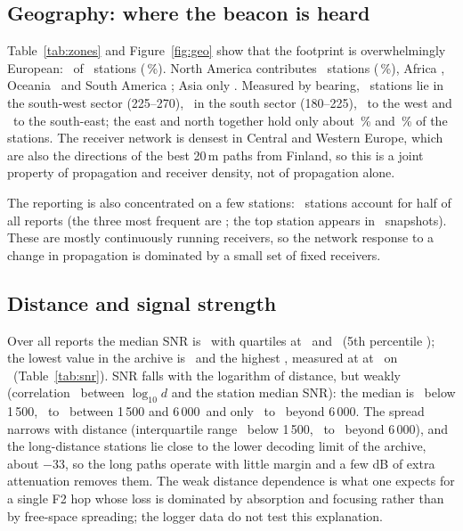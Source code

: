 \documentclass[10pt,a4paper]{article}
\begin{document}
\subsection{Geography: where the beacon is heard}
Table~\ref{tab:zones} and Figure~\ref{fig:geo} show that the footprint is overwhelmingly European: \zneurope\ of \nPairs\ stations (\zpeurope\,\%). North America contributes \znnamerica\ stations (\zpnamerica\,\%), Africa \znafrica, Oceania \znpacific\ and South America \znsamerica; Asia only \znasia. Measured by bearing, \secSW\ stations lie in the south-west sector (225--270\textdegree), \secS\ in the south sector (180--225\textdegree), \secW\ to the west and \secSE\ to the south-east; the east and north together hold only about \eastPct\,\% and \northPct\,\% of the stations. The receiver network is densest in Central and Western Europe, which are also the directions of the best 20\,m paths from Finland, so this is a joint property of propagation and receiver density, not of propagation alone.

The reporting is also concentrated on a few stations: \halfStations\ stations account for half of all reports (the three most frequent are \topStations; the top station appears in \topStationSnaps\ snapshots). These are mostly continuously running receivers, so the network response to a change in propagation is dominated by a small set of fixed receivers.



\subsection{Distance and signal strength}
Over all reports the median SNR is \wSnrMed\dB\ with quartiles at \wSnrQB\ and \wSnrQD\dB\ (5th percentile \wSnrPF\dB); the lowest value in the archive is \snrLowest\dB\ and the highest \snrTopDB\dB, measured at \callsign{\snrTopCall} at \snrTopDist\km\ on \snrTopDate\ (Table~\ref{tab:snr}). SNR falls with the logarithm of distance, but weakly (correlation \corrDistSNR\ between $\log_{10}d$ and the station median SNR): the median is \snrBandA\dB\ below 1\,500\km, \snrBandB\ to \snrBandC\dB\ between 1\,500 and 6\,000\km\ and only \snrBandD\ to \snrBandE\dB\ beyond 6\,000\km. The spread narrows with distance (interquartile range \snrIqrA\dB\ below 1\,500\km, \snrIqrD\ to \snrIqrE\dB\ beyond 6\,000\km), and the long-distance stations lie close to the lower decoding limit of the archive, about $-$33\dB, so the long paths operate with little margin and a few dB of extra attenuation removes them. The weak distance dependence is what one expects for a single F2 hop whose loss is dominated by absorption and focusing rather than by free-space spreading; the logger data do not test this explanation.
\end{document}
